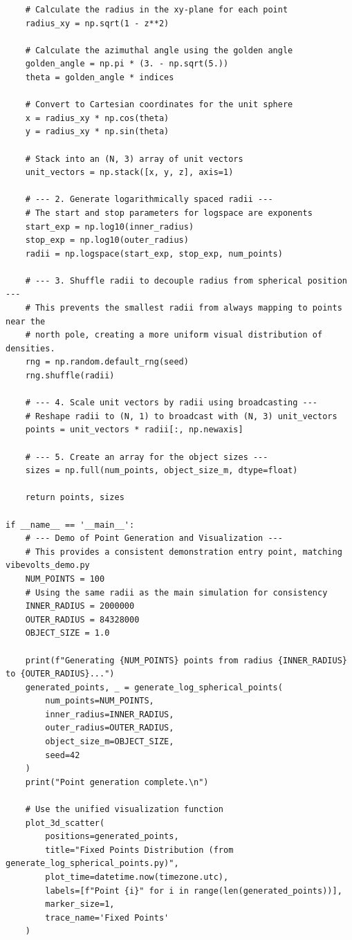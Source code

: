 \documentclass[11pt]{article}
\begin{document}
\begin{Verbatim}
    # Calculate the radius in the xy-plane for each point
    radius_xy = np.sqrt(1 - z**2)

    # Calculate the azimuthal angle using the golden angle
    golden_angle = np.pi * (3. - np.sqrt(5.))
    theta = golden_angle * indices

    # Convert to Cartesian coordinates for the unit sphere
    x = radius_xy * np.cos(theta)
    y = radius_xy * np.sin(theta)

    # Stack into an (N, 3) array of unit vectors
    unit_vectors = np.stack([x, y, z], axis=1)

    # --- 2. Generate logarithmically spaced radii ---
    # The start and stop parameters for logspace are exponents
    start_exp = np.log10(inner_radius)
    stop_exp = np.log10(outer_radius)
    radii = np.logspace(start_exp, stop_exp, num_points)

    # --- 3. Shuffle radii to decouple radius from spherical position ---
    # This prevents the smallest radii from always mapping to points near the
    # north pole, creating a more uniform visual distribution of densities.
    rng = np.random.default_rng(seed)
    rng.shuffle(radii)

    # --- 4. Scale unit vectors by radii using broadcasting ---
    # Reshape radii to (N, 1) to broadcast with (N, 3) unit_vectors
    points = unit_vectors * radii[:, np.newaxis]

    # --- 5. Create an array for the object sizes ---
    sizes = np.full(num_points, object_size_m, dtype=float)

    return points, sizes

if __name__ == '__main__':
    # --- Demo of Point Generation and Visualization ---
    # This provides a consistent demonstration entry point, matching vibevolts_demo.py
    NUM_POINTS = 100
    # Using the same radii as the main simulation for consistency
    INNER_RADIUS = 2000000
    OUTER_RADIUS = 84328000
    OBJECT_SIZE = 1.0

    print(f"Generating {NUM_POINTS} points from radius {INNER_RADIUS} to {OUTER_RADIUS}...")
    generated_points, _ = generate_log_spherical_points(
        num_points=NUM_POINTS,
        inner_radius=INNER_RADIUS,
        outer_radius=OUTER_RADIUS,
        object_size_m=OBJECT_SIZE,
        seed=42
    )
    print("Point generation complete.\n")

    # Use the unified visualization function
    plot_3d_scatter(
        positions=generated_points,
        title="Fixed Points Distribution (from generate_log_spherical_points.py)",
        plot_time=datetime.now(timezone.utc),
        labels=[f"Point {i}" for i in range(len(generated_points))],
        marker_size=1,
        trace_name='Fixed Points'
    )
\end{Verbatim}
\end{document}
